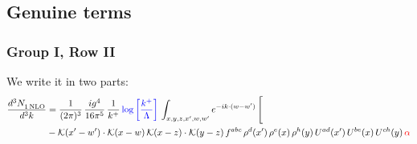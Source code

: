 \documentclass[9pt]{article}
\numberwithin{equation}{section}
\begin{document}
\subsection{Genuine terms}
\subsubsection{Group I, Row II}
We write it in two parts: 
\begin{align}
  \frac{d^{3}N_{1\,\rm NLO}^{\rm}}{d^{3}k}  & = \frac{1}{(2\pi)^{3}}\, \frac{ig^{4}}{16\pi^{5}}\, \frac{1}{k^{+}}\, {\color{blue}\log{\left[\frac{k^{+}}{\Lambda}\right]}}\,\int_{x,y,z,x^{\prime},w,w^{\prime}}e^{-ik\cdot (w-w')}\, \Bigg[\notag \\ & -\mathcal{K}(x'-w')\cdot\mathcal{K}(x-w)\,\mathcal{K}(x-z)\cdot\mathcal{K}(y-z)\, f^{abc}\,\rho^{d}(x')\,\rho^{e}(x)\,\rho^{h}(y)\,U^{ad}(x')\,U^{be}(x)\,U^{ch}(y)\,{\color{red}\alpha}\notag\\

\end{align}
\end{document}
